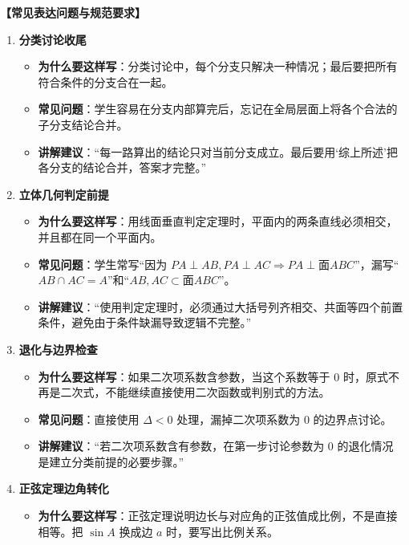 \documentclass[11pt,a4paper]{ctexart}
\newcommand{\teachblock}[2]{%
  \par\addvspace{0.55em}%
  \noindent\textbf{【#1】}\par\nobreak
  \begingroup
    \raggedright
    \setlength{\parskip}{0.35em}%
    #2\par
  \endgroup
}
\begin{document}
\teachblock{常见表达问题与规范要求}{
  \begin{enumerate}[label=\arabic*. , leftmargin=2em, itemsep=0.3em]
    \item \textbf{分类讨论收尾}
      \begin{itemize}[leftmargin=1.5em, itemsep=0.1em]
        \item \textbf{为什么要这样写}：分类讨论中，每个分支只解决一种情况；最后要把所有符合条件的分支合在一起。
        \item \textbf{常见问题}：学生容易在分支内部算完后，忘记在全局层面上将各个合法的子分支结论合并。
        \item \textbf{讲解建议}：“每一路算出的结论只对当前分支成立。最后要用‘综上所述’把各分支的结论合并，答案才完整。”
      \end{itemize}
    \item \textbf{立体几何判定前提}
      \begin{itemize}[leftmargin=1.5em, itemsep=0.1em]
        \item \textbf{为什么要这样写}：用线面垂直判定定理时，平面内的两条直线必须相交，并且都在同一个平面内。
        \item \textbf{常见问题}：学生常写“因为 \(PA \perp AB, PA \perp AC \Rightarrow PA \perp \text{面} ABC\)”，漏写“\(AB \cap AC = A\)”和“\(AB, AC \subset \text{面} ABC\)”。
        \item \textbf{讲解建议}：“使用判定定理时，必须通过大括号列齐相交、共面等四个前置条件，避免由于条件缺漏导致逻辑不完整。”
      \end{itemize}
    \item \textbf{退化与边界检查}
      \begin{itemize}[leftmargin=1.5em, itemsep=0.1em]
        \item \textbf{为什么要这样写}：如果二次项系数含参数，当这个系数等于 0 时，原式不再是二次式，不能继续直接使用二次函数或判别式的方法。
        \item \textbf{常见问题}：直接使用 \(\Delta < 0\) 处理，漏掉二次项系数为 0 的边界点讨论。
        \item \textbf{讲解建议}：“若二次项系数含有参数，在第一步讨论参数为 0 的退化情况是建立分类前提的必要步骤。”
      \end{itemize}
    \item \textbf{正弦定理边角转化}
      \begin{itemize}[leftmargin=1.5em, itemsep=0.1em]
        \item \textbf{为什么要这样写}：正弦定理说明边长与对应角的正弦值成比例，不是直接相等。把 \(\sin A\) 换成边 \(a\) 时，要写出比例关系。

\end{itemize}
\end{enumerate}}
\end{document}
